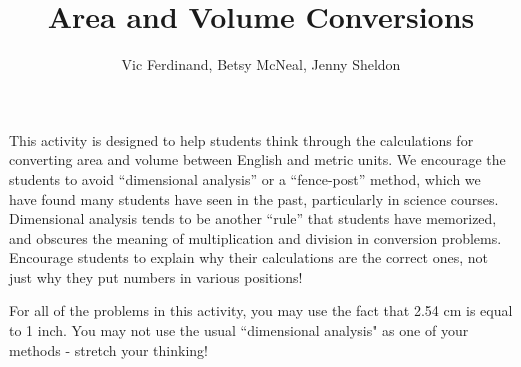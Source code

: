 \documentclass{ximera}
\title{Area and Volume Conversions}
\author{Vic Ferdinand, Betsy McNeal, Jenny Sheldon}
\begin{document}
\begin{abstract}\end{abstract}
\maketitle

\begin{instructorIntro}

This activity is designed to help students think through the calculations for converting area and volume between English and metric units.  We encourage the students to avoid ``dimensional analysis'' or a ``fence-post'' method, which we have found many students have seen in the past, particularly in science courses.  Dimensional analysis tends to be another ``rule'' that students have memorized, and obscures the meaning of multiplication and division in conversion problems.  Encourage students to explain why their calculations are the correct ones, not just why they put numbers in various positions!



\end{instructorIntro}

For all of the problems in this activity, you may use the fact that 2.54 cm is equal to 1 inch.  You may not use the usual ``dimensional analysis" as one of your methods - stretch your thinking!
\end{document}
